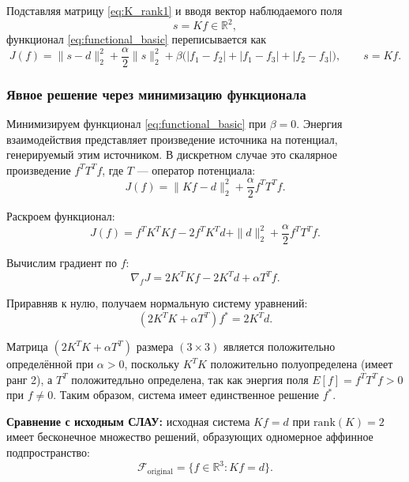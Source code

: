 \documentclass[a4paper,14pt,oneside,openany]{extarticle}
\begin{document}
Подставляя матрицу \eqref{eq:K_rank1} и вводя вектор наблюдаемого поля
\begin{equation}\label{eq:field_observation}
    s = K f \in \mathbb{R}^2,
\end{equation}
функционал \eqref{eq:functional_basic} переписывается как
\begin{equation}\label{eq:functional_degenerate}
    J(f)=\|s-d\|_2^2 + \frac{\alpha}{2}\|s\|_2^2 + \beta \bigl(|f_1-f_2| + |f_1-f_3| + |f_2-f_3|\bigr),
    \qquad s=Kf.
\end{equation}

\subsubsection{Явное решение через минимизацию функционала}

Минимизируем функционал \eqref{eq:functional_basic} при $\beta=0$. Энергия взаимодействия представляет 
произведение источника на потенциал, генерируемый этим источником. В дискретном случае это скалярное 
произведение $f^T T^T f$, где $T$ — оператор потенциала:
\begin{equation}
    J(f) = \|Kf-d\|_2^2 + \frac{\alpha}{2}f^T T^T f.
\end{equation}

Раскроем функционал:
\begin{equation}
    J(f) = f^TK^TKf - 2f^TK^Td + \|d\|_2^2 + \frac{\alpha}{2}f^T T^T f.
\end{equation}

Вычислим градиент по $f$:
\begin{equation}
    \nabla_f J = 2K^TKf - 2K^Td + \alpha T^T f.
\end{equation}

Приравняв к нулю, получаем нормальную систему уравнений:
\begin{equation}\label{eq:normal_equations}
    (2K^TK + \alpha T^T)f^* = 2K^Td.
\end{equation}

Матрица $(2K^TK + \alpha T^T)$ размера $(3 \times 3)$ является положительно определённой при $\alpha > 0$, 
поскольку $K^TK$ положительно полуопределена (имеет ранг 2), а $T^T$ положитедльно определена, так как энергия 
поля $E[f] = f^T T^T f > 0$ при $f \neq 0$.
Таким образом, система имеет единственное решение $f^*$.

\textbf{Сравнение с исходным СЛАУ:} исходная система $Kf = d$ при $\mathrm{rank}(K) = 2$ имеет бесконечное 
множество решений, образующих одномерное аффинное подпространство:
\begin{equation}\label{eq:original_solution_set}
    \mathcal{F}_{\mathrm{original}} = \{f \in \mathbb{R}^3 : Kf = d\}.
\end{equation}
\end{document}
